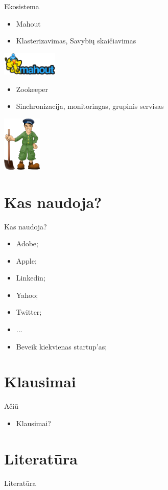 \documentclass{beamer}
\begin{document}
\begin{frame}[allowframebreaks=0.8]{Ekosistema}
    \begin{itemize}
      \item Mahout
      \item Klasterizavimas, Savybių skaičiavimas
    \end{itemize}
    \begin{center}
      \includegraphics[width=100px]{img/mahout_logo.png}
    \end{center}

    \framebreak

    \begin{itemize}
      \item Zookeeper
      \item Sinchronizacija, monitoringas, grupinis servisas
    \end{itemize}
    \begin{center}
      \includegraphics[height=100px]{img/zookeeper.png}
    \end{center}

  \end{frame}

  \section{Kas naudoja?}
  \begin{frame}{Kas naudoja?}
    \begin{itemize}
      \item Adobe;
      \item Apple;
      \item Linkedin;
      \item Yahoo;
      \item Twitter;
      \item ...
      \item Beveik kiekvienas startup'as;
    \end{itemize}
  \end{frame}

  \section{Klausimai}
  \begin{frame}{Ačiū}
    \begin{itemize}
      \item Klausimai?
    \end{itemize}
  \end{frame}

  \section{Literatūra}
  \begin{frame}{Literatūra}
    
    
  \end{frame}
\end{document}
